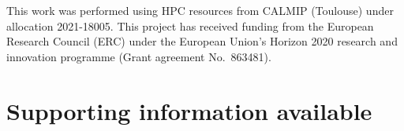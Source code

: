 \documentclass[aip,jcp,reprint,noshowkeys,superscriptaddress]{revtex4-1}
\begin{document}
\begin{acknowledgements}
This work was performed using HPC resources from CALMIP (Toulouse) under allocation 2021-18005.
This project has received funding from the European Research Council (ERC) under the European Union's Horizon 2020 research and innovation programme (Grant agreement No.~863481).
\end{acknowledgements}

\section*{Supporting information available}
\label{sec:SI}



\end{document}
